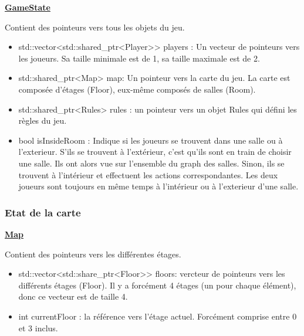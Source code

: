 \underline{\textbf{GameState}}
\par Contient des pointeurs vers tous les objets du jeu.
\begin{itemize}
    \item std::vector<std::shared\_ptr<Player>> players : Un vecteur de pointeurs vers les joueurs. Sa taille minimale est de 1, sa taille maximale est de 2.
    \item std::shared\_ptr<Map> map: Un pointeur vers la carte du jeu. La carte est composée d'étages (Floor), eux-même composés de salles (Room). 
    \item std::shared\_ptr<Rules> rules : un pointeur vers un objet Rules qui défini les règles du jeu.
    \item  bool isInsideRoom : Indique si les joueurs se trouvent dans une salle ou  à l'exterieur. S'ils se trouvent à l'extérieur, c'est qu'ils sont en train de choisir une salle. Ils ont alors vue sur l'ensemble du graph des salles. Sinon, ils se trouvent à l'intérieur et effectuent les actions correspondantes. Les deux joueurs sont toujours en même temps à l'intérieur ou à l'exterieur d'une salle.
\end{itemize}

\subsubsection{Etat de la carte}
\underline{\textbf{Map}}
\par Contient des pointeurs vers les différentes étages.
\begin{itemize}
    \item std::vector<std::share\_ptr<Floor>> floors: vercteur de pointeurs vers les différents étages (Floor). Il y a forcément 4 étages (un pour chaque élément), donc ce vecteur est de taille 4. 
    \item int currentFloor : la référence vers l'étage actuel. Forcément comprise entre 0 et 3 inclus.
\end{itemize}

